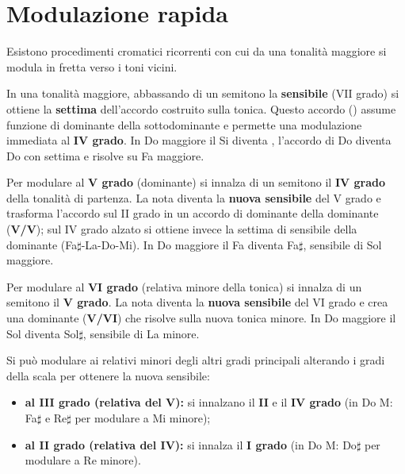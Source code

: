 \section{Modulazione rapida}
\label{sec:regole_pratiche_modulazione}

Esistono procedimenti cromatici ricorrenti con cui da una tonalità maggiore si modula in fretta verso i toni vicini.

\begin{regola}
	\label{reg:mod_iv_sensibile_abbassata}
	In una tonalità maggiore, abbassando di un semitono la \textbf{sensibile} (VII grado) si ottiene la \textbf{settima} dell'accordo costruito sulla tonica. Questo accordo () assume funzione di dominante della sottodominante e permette una modulazione immediata al \textbf{IV grado}. In Do maggiore il Si diventa \Sibemolle{}, l'accordo di Do diventa Do con settima e risolve su Fa maggiore.
\end{regola}

\begin{regola}
	\label{reg:mod_v_quarto_innalzato}
	Per modulare al \textbf{V grado} (dominante) si innalza di un semitono il \textbf{IV grado} della tonalità di partenza. La nota diventa la \textbf{nuova sensibile} del V grado e trasforma l'accordo sul II grado in un accordo di dominante della dominante (\textbf{V/V}); sul IV grado alzato si ottiene invece la settima di sensibile della dominante (Fa$\sharp$-La-Do-Mi). In Do maggiore il Fa diventa Fa$\sharp$, sensibile di Sol maggiore.
\end{regola}

\begin{regola}
	\label{reg:mod_vi_quinto_innalzato}
	Per modulare al \textbf{VI grado} (relativa minore della tonica) si innalza di un semitono il \textbf{V grado}. La nota diventa la \textbf{nuova sensibile} del VI grado e crea una dominante (\textbf{V/VI}) che risolve sulla nuova tonica minore. In Do maggiore il Sol diventa Sol$\sharp$, sensibile di La minore.
\end{regola}

\begin{regola}
	\label{reg:mod_altri_minori}
	Si può modulare ai relativi minori degli altri gradi principali alterando i gradi della scala per ottenere la nuova sensibile:
	\begin{itemize}
		\item \textbf{al III grado (relativa del V):} si innalzano il \textbf{II} e il \textbf{IV grado} (in Do M: Fa$\sharp$ e Re$\sharp$ per modulare a Mi minore);
		\item \textbf{al II grado (relativa del IV):} si innalza il \textbf{I grado} (in Do M: Do$\sharp$ per modulare a Re minore).
	\end{itemize}
\end{regola}
